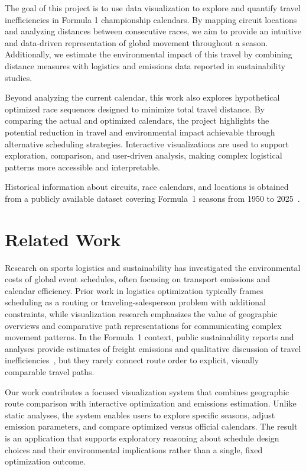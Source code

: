 \documentclass{egpubl}
\begin{document}
The goal of this project is to use data visualization to explore and quantify travel inefficiencies in Formula 1 championship calendars. By mapping circuit locations and analyzing distances between consecutive races, we aim to provide an intuitive and data-driven representation of global movement throughout a season. Additionally, we estimate the environmental impact of this travel by combining distance measures with logistics and emissions data reported in sustainability studies.

Beyond analyzing the current calendar, this work also explores hypothetical optimized race sequences designed to minimize total travel distance. By comparing the actual and optimized calendars, the project highlights the potential reduction in travel and environmental impact achievable through alternative scheduling strategies. Interactive visualizations are used to support exploration, comparison, and user-driven analysis, making complex logistical patterns more accessible and interpretable.

Historical information about circuits, race calendars, and locations is obtained from a publicly available dataset covering Formula~1 seasons from 1950 to 2025~\cite{f1dataset}.

\section{Related Work}

Research on sports logistics and sustainability has investigated the environmental costs of global event schedules, often focusing on transport emissions and calendar efficiency. Prior work in logistics optimization typically frames scheduling as a routing or traveling-salesperson problem with additional constraints, while visualization research emphasizes the value of geographic overviews and comparative path representations for communicating complex movement patterns. In the Formula~1 context, public sustainability reports and analyses provide estimates of freight emissions and qualitative discussion of travel inefficiencies~\cite{F1Sustainability2025,F1LogisticsDHL}, but they rarely connect route order to explicit, visually comparable travel paths.

Our work contributes a focused visualization system that combines geographic route comparison with interactive optimization and emissions estimation. Unlike static analyses, the system enables users to explore specific seasons, adjust emission parameters, and compare optimized versus official calendars. The result is an application that supports exploratory reasoning about schedule design choices and their environmental implications rather than a single, fixed optimization outcome.
\end{document}
